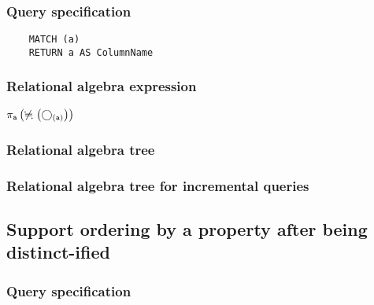 	\subsubsection*{Query specification}

	\begin{lstlisting}
	MATCH (a)
	RETURN a AS ColumnName
	\end{lstlisting}


	\subsubsection*{Relational algebra expression}

	$\projection{\var{a}} \left(\alldifferent{} \left(\getvertices{a}{}\right)\right)$

	\subsubsection*{Relational algebra tree}


	\subsubsection*{Relational algebra tree for incremental queries}

	\subsection{Support ordering by a property after being distinct-ified}

	\subsubsection*{Query specification}

